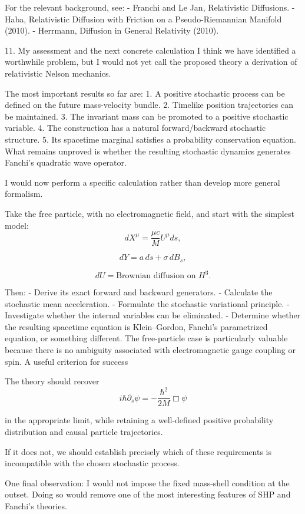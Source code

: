 For the relevant background, see:
- Franchi and Le Jan, Relativistic Diffusions.
- Haba, Relativistic Diffusion with Friction on a Pseudo-Riemannian Manifold (2010).
- Herrmann, Diffusion in General Relativity (2010).

11. My assessment and the next concrete calculation
I think we have identified a worthwhile problem, but I would not yet call the proposed theory a derivation of relativistic Nelson mechanics.

The most important results so far are:
1. A positive stochastic process can be defined on the future mass-velocity bundle.
2. Timelike position trajectories can be maintained.
3. The invariant mass can be promoted to a positive stochastic variable.
4. The construction has a natural forward/backward stochastic structure.
5. Its spacetime marginal satisfies a probability conservation equation.
What remains unproved is whether the resulting stochastic dynamics generates Fanchi's quadratic wave operator.

I would now perform a specific calculation rather than develop more general formalism.

Take the free particle, with no electromagnetic field, and start with the simplest model:
\[
dX^\mu=\frac{\mu c}{M}U^\mu ds,
\]

\[
dY=a\,ds+\sigma\,dB_s,
\]

\[
dU=\text{Brownian diffusion on }H^3.
\]

Then:
- Derive its exact forward and backward generators.
- Calculate the stochastic mean acceleration.
- Formulate the stochastic variational principle.
- Investigate whether the internal variables can be eliminated.
- Determine whether the resulting spacetime equation is Klein–Gordon, Fanchi's parametrized equation, or something different.
The free-particle case is particularly valuable because there is no ambiguity associated with electromagnetic gauge coupling or spin.
A useful criterion for success

The theory should recover
\[
i\hbar\partial_s\psi
=
-\frac{\hbar^2}{2M}\Box\psi
\]

in the appropriate limit, while retaining a well-defined positive probability distribution and causal particle trajectories.

If it does not, we should establish precisely which of these requirements is incompatible with the chosen stochastic process.

One final observation: I would not impose the fixed mass-shell condition at the outset. Doing so would remove one of the most interesting features of SHP and Fanchi's theories.

